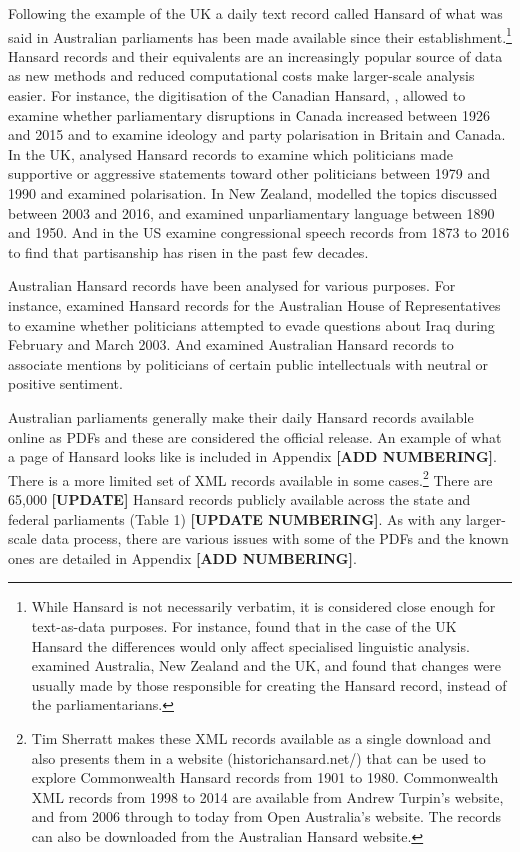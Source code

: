 \documentclass[12pt,]{article}
\theoremstyle{definition}
\theoremstyle{definition}
\theoremstyle{definition}
\theoremstyle{remark}
\begin{document}
Following the example of the UK a daily text record called Hansard of
what was said in Australian parliaments has been made available since
their establishment.\footnote{While Hansard is not necessarily verbatim,
  it is considered close enough for text-as-data purposes. For instance,
  \citet{Mollin2008} found that in the case of the UK Hansard the
  differences would only affect specialised linguistic analysis.
  \citet{Edwards2016} examined Australia, New Zealand and the UK, and
  found that changes were usually made by those responsible for creating
  the Hansard record, instead of the parliamentarians.} Hansard records
and their equivalents are an increasingly popular source of data as new
methods and reduced computational costs make larger-scale analysis
easier. For instance, the digitisation of the Canadian Hansard,
\citet{BeelenEtc2017}, allowed \citet{Whyte2017} to examine whether
parliamentary disruptions in Canada increased between 1926 and 2015 and
\citet{RheaultCochran2018} to examine ideology and party polarisation in
Britain and Canada. In the UK, \citet{Duthie2016} analysed Hansard
records to examine which politicians made supportive or aggressive
statements toward other politicians between 1979 and 1990 and
\citet{PetersonSpirling2018} examined polarisation. In New Zealand,
\citet{Curran2017} modelled the topics discussed between 2003 and 2016,
and \citet{Graham2016} examined unparliamentary language between 1890
and 1950. And in the US \citet{GentzkowShapiroTaddy2018} examine
congressional speech records from 1873 to 2016 to find that partisanship
has risen in the past few decades.

Australian Hansard records have been analysed for various purposes. For
instance, \citet{Rasiah2010} examined Hansard records for the Australian
House of Representatives to examine whether politicians attempted to
evade questions about Iraq during February and March 2003. And
\citet{GansLeigh2012} examined Australian Hansard records to associate
mentions by politicians of certain public intellectuals with neutral or
positive sentiment.

Australian parliaments generally make their daily Hansard records
available online as PDFs and these are considered the official release.
An example of what a page of Hansard looks like is included in Appendix
\textbf{{[}ADD NUMBERING{]}}. There is a more limited set of XML records
available in some cases.\footnote{Tim Sherratt makes these XML records
  available as a single download and also presents them in a website
  (historichansard.net/) that can be used to explore Commonwealth
  Hansard records from 1901 to 1980. Commonwealth XML records from 1998
  to 2014 are available from Andrew Turpin's website, and from 2006
  through to today from Open Australia's website. The records can also
  be downloaded from the Australian Hansard website.} There are 65,000
\textbf{{[}UPDATE{]}} Hansard records publicly available across the
state and federal parliaments (Table 1) \textbf{{[}UPDATE NUMBERING{]}}.
As with any larger-scale data process, there are various issues with
some of the PDFs and the known ones are detailed in Appendix
\textbf{{[}ADD NUMBERING{]}}.
\end{document}
